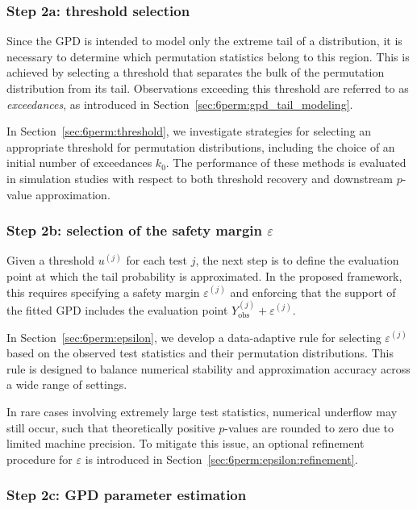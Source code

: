 \subsubsection*{Step 2a: threshold selection}

Since the GPD is intended to model only the extreme tail of a distribution, it is necessary to determine which permutation statistics belong to this region. This is achieved by selecting a threshold that separates the bulk of the permutation distribution from its tail. Observations exceeding this threshold are referred to as \emph{exceedances}, as introduced in Section~\ref{sec:6perm:gpd_tail_modeling}.

In Section~\ref{sec:6perm:threshold}, we investigate strategies for selecting an appropriate threshold for permutation distributions, including the choice of an initial number of exceedances $k_0$. The performance of these methods is evaluated in simulation studies with respect to both threshold recovery and downstream $p$-value approximation.

\subsubsection*{Step 2b: selection of the safety margin \texorpdfstring{$\varepsilon$}{epsilon}}

Given a threshold $u^{(j)}$ for each test $j$, the next step is to define the evaluation point at which the tail probability is approximated. In the proposed framework, this requires specifying a safety margin $\varepsilon^{(j)}$ and enforcing that the support of the fitted GPD includes the evaluation point $Y_{\mathrm{obs}}^{(j)} + \varepsilon^{(j)}$. 

In Section~\ref{sec:6perm:epsilon}, we develop a data-adaptive rule for selecting $\varepsilon^{(j)}$ based on the observed test statistics and their permutation distributions. This rule is designed to balance numerical stability and approximation accuracy across a wide range of settings.

In rare cases involving extremely large test statistics, numerical underflow may still occur, such that theoretically positive $p$-values are rounded to zero due to limited machine precision. To mitigate this issue, an optional refinement procedure for $\varepsilon$ is introduced in Section~\ref{sec:6perm:epsilon:refinement}.

\subsubsection*{Step 2c: GPD parameter estimation}

